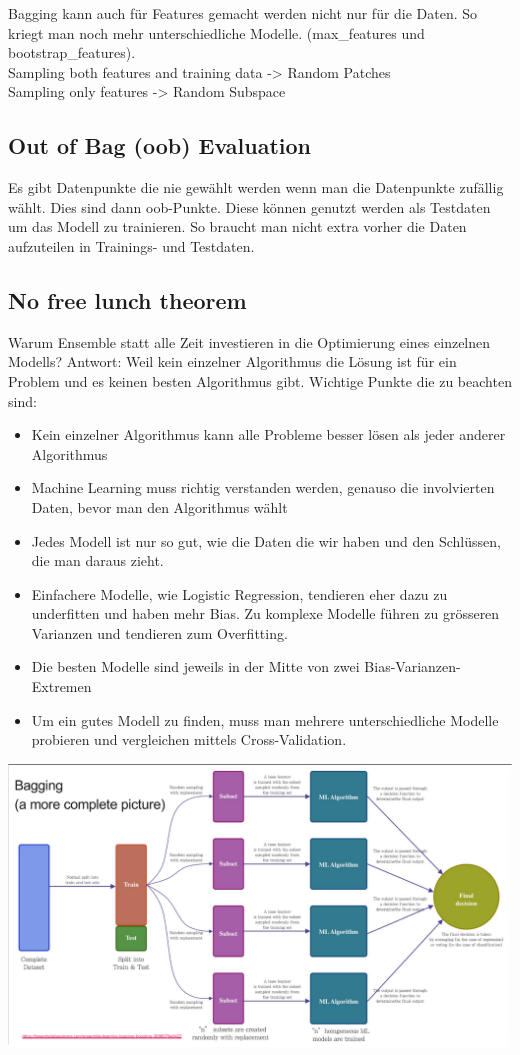 Bagging kann auch für Features gemacht werden nicht nur für die Daten. So kriegt man noch mehr unterschiedliche Modelle. (max\_features und bootstrap\_features).\\
Sampling both features and training data -> Random Patches\\
Sampling only features -> Random Subspace\\
\subsection{Out of Bag (oob) Evaluation}
Es gibt Datenpunkte die nie gewählt werden wenn man die Datenpunkte zufällig wählt. Dies sind dann oob-Punkte. Diese können genutzt werden als Testdaten um das Modell zu trainieren. So braucht man nicht extra vorher die Daten aufzuteilen in Trainings- und Testdaten.
\subsection{No free lunch theorem}
Warum Ensemble statt alle Zeit investieren in die Optimierung eines einzelnen Modells? Antwort: Weil kein einzelner Algorithmus die Lösung ist für ein Problem und es keinen besten Algorithmus gibt. Wichtige Punkte die zu beachten sind:
\begin{itemize}
\item Kein einzelner Algorithmus kann alle Probleme besser lösen als jeder anderer Algorithmus
\item Machine Learning muss richtig verstanden werden, genauso die involvierten Daten, bevor man den Algorithmus wählt
\item Jedes Modell ist nur so gut, wie die Daten die wir haben und den Schlüssen, die man daraus zieht.
\item Einfachere Modelle, wie Logistic Regression, tendieren eher dazu zu underfitten und haben mehr Bias. Zu komplexe Modelle führen zu grösseren Varianzen und tendieren zum Overfitting.
\item Die besten Modelle sind jeweils in der Mitte von zwei Bias-Varianzen-Extremen
\item Um ein gutes Modell zu finden, muss man mehrere unterschiedliche Modelle probieren und vergleichen mittels Cross-Validation.
\end{itemize}
\includegraphics[width=\linewidth]{img/bagging_overview.png}
